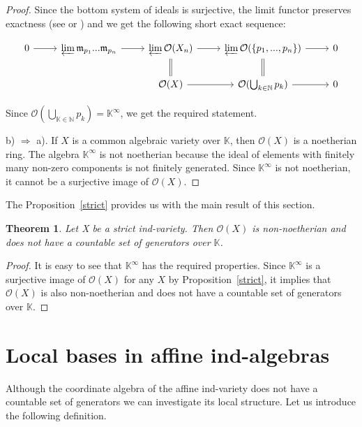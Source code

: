 \documentclass[a4paper,draft,reqno,12pt]{amsart}
\newtheorem{theorem}{Theorem}
\theoremstyle{definition}
\theoremstyle{remark}
\def\BK{{\mathbb K}}
\def\BK{{\mathbb K}}
\def\CO{\mathcal{O}}
\def\mf{\mathfrak{m}}
\begin{document}
\begin{proof}
    Since the bottom system of ideals is surjective, the limit functor preserves exactness (see \cite[Proposition 10.2]{AM} or \cite[Proposition 3.5.7]{W}) and we get the following short exact sequence:
    
    \[ \begin{tikzcd}[sep=normal]
    0 \arrow{r} & \varprojlim \mf_{p_1}...\mf_{p_n} \arrow{r} & \varprojlim \mathcal{O}(X_n) \arrow{r} \arrow[equal]{d} & \varprojlim \mathcal{O}(\{p_1, ..., p_n\}) \arrow{r} \arrow[equal]{d} & 0\\%
    & & \mathcal{O}(X) \arrow{r} & \mathcal{O}(\bigcup_{k \in \mathbb{N}} p_k) \arrow{r} & 0
    \end{tikzcd}
    \]
    
    Since $\mathcal{O}(\bigcup_{\BK \in \mathbb{N}} p_k) = \BK^{\infty}$, we get the required statement.
    \vspace{2mm}

    b) $\Rightarrow$ a). If $X$ is a common algebraic variety over $\BK$, then $\CO(X)$ is a noetherian ring. The algebra $\BK^{\infty}$ is not noetherian because the ideal of elements with finitely many non-zero components is not finitely generated. Since $\BK^{\infty}$ is not noetherian, it cannot be a surjective image of $\CO(X)$.

    
\end{proof}

The Proposition~\ref{strict} provides us with the main result of this section.

\begin{theorem}\label{notcount}
    Let X be a strict ind-variety. Then $\mathcal{O}(X)$ is non-noetherian and does not have a countable set of generators over $\BK$.
\end{theorem}
\begin{proof}
    It is easy to see that $\BK^{\infty}$ has the required properties. Since $\BK^{\infty}$ is a surjective image of $\mathcal{O}(X)$ for any $X$ by Proposition~\ref{strict}, it implies that $\mathcal{O}(X)$ is also non-noetherian and does not have a countable set of generators over $\BK$.
    
\end{proof}


\section{Local bases in affine ind-algebras}

Although the coordinate algebra of the affine ind-variety does not have a countable set of generators we can investigate its local structure. Let us introduce the following definition.
\end{document}
